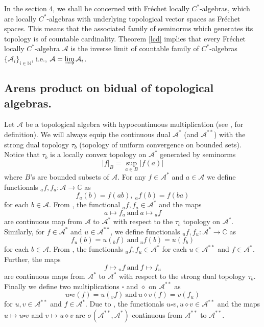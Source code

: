 \documentclass[10pt]{article}
\theoremstyle{definition}
\begin{document}
	In the section 4, we shall be concerned with Fr\'echet locally $C^*$-algebras, which are locally $C^*$-algebras with underlying topological vector spaces as Fr\'echet spaces. This means that the associated family of seminorms which generates its topology is of  countable cardinality. Theorem \ref{lcd} implies that every Fr\'echet locally $C^*$-algebra $\mathcal A$ is the inverse limit of countable family of $C^*$-algebras $\{\mathcal A_i\}_{i\in \mathbb N}$, i.e., $\mathcal A=\varinjlim \mathcal A_i$.
	
	\subsection{Arens product on bidual of topological algebras.}\label{apd}
	
	Let $\mathcal A$ be a topological algebra with hypocontinuous multiplication (see \cite{Filali},\cite{Gulick} for definition). We will always equip the continuous dual $\mathcal A^*$ (and $\mathcal A^{**}$) with the strong dual topology $\tau_b$ (topology of uniform convergence on bounded sets). Notice that 
	$\tau_b$ is a locally convex topology on $\mathcal A^*$ generated by seminorms $$|f|_B=\sup_{a\in B}|f(a)|$$ where $B$'s are bounded subsets of $\mathcal A$. For any $f\in \mathcal A^*$ and $a\in \mathcal A$ we define functionals ${}_{a}f,f_a:\mathcal A\to \mathbb C$ as $$f_a(b)=f(ab),~{}_{a}f(b)=f(ba)$$ for each $b\in \mathcal A$. From \cite[Lemma 3.1]{Gulick}, the functional ${}_{a}f,f_a\in \mathcal A^*$ and the maps $$a\mapsto f_a~\text{and}~a\mapsto {}_{a}f$$ are continuous map from $\mathcal A$ to $\mathcal A^*$ with respect to the $\tau_b$ topology on $\mathcal A^*$. Similarly, for $f\in \mathcal A^{*}$ and $u\in \mathcal A^{**}$, we define functionals ${}_{u}f,f_u:\mathcal A^*\to \mathbb C$ as $$f_u(b)=u({}_{b}f)~\text{and}~{}_{u}f(b)=u(f_b)$$ for each $b\in \mathcal A$. From \cite[Lemma 3.2]{Gulick}, the functionals ${}_{u}f,f_u\in \mathcal A^*$ for each $u\in \mathcal A^{**}$ and $f\in \mathcal A^*$. Further, the maps $$f\mapsto {}_{u}f~\text{and}~f\mapsto f_u$$ are continuous maps from $\mathcal A^*$ to $\mathcal A^*$ with respect to the strong dual topology $\tau_b$. Finally we define two multiplications $\square$ and $\diamond$ on $\mathcal A^{**}$ as $$u\square v(f)=u({}_{v}f)~\text{and}~u\diamond v(f)=v(f_u)$$ for $u,v\in \mathcal A^{**}$ and $f\in \mathcal A^*$. Due to \cite[Lemma 3.4]{Gulick}, the functionals $u\square v, u\diamond v\in \mathcal A^{**}$ and the maps $u\mapsto u\square v$ and $v\mapsto u\diamond v$ are $\sigma(\mathcal A^{**},\mathcal A^*)$-continuous from $\mathcal A^{**}$ to $\mathcal A^{**}$.	
\end{document}
